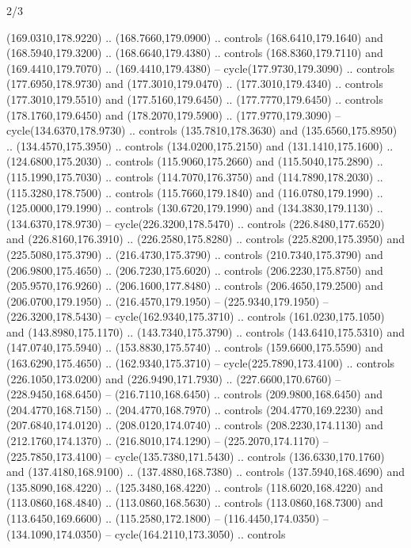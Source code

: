 \begin{flagdescription}{2/3}
\begin{scope}[xshift=0.5\flaglength,yshift=0.5\flagwidth,scale=\stretchfactor]
\begin{scope}[scale=0.001645\flagwidth,yshift=65mm,xshift=-63mm]
\begin{scope}[y=0.80pt, x=0.80pt, yscale=-1,]
\begin{scope}[cm={{1.33333,0.0,0.0,1.33333,(0.0,1e-05)}}]
  (169.0310,178.9220) .. (168.7660,179.0900) .. controls (168.6410,179.1640) and
  (168.5940,179.3200) .. (168.6640,179.4380) .. controls (168.8360,179.7110) and
  (169.4410,179.7070) .. (169.4410,179.4380) -- cycle(177.9730,179.3090) ..
  controls (177.6950,178.9730) and (177.3010,179.0470) .. (177.3010,179.4340) ..
  controls (177.3010,179.5510) and (177.5160,179.6450) .. (177.7770,179.6450) ..
  controls (178.1760,179.6450) and (178.2070,179.5900) .. (177.9770,179.3090) --
  cycle(134.6370,178.9730) .. controls (135.7810,178.3630) and
  (135.6560,175.8950) .. (134.4570,175.3950) .. controls (134.0200,175.2150) and
  (131.1410,175.1600) .. (124.6800,175.2030) .. controls (115.9060,175.2660) and
  (115.5040,175.2890) .. (115.1990,175.7030) .. controls (114.7070,176.3750) and
  (114.7890,178.2030) .. (115.3280,178.7500) .. controls (115.7660,179.1840) and
  (116.0780,179.1990) .. (125.0000,179.1990) .. controls (130.6720,179.1990) and
  (134.3830,179.1130) .. (134.6370,178.9730) -- cycle(226.3200,178.5470) ..
  controls (226.8480,177.6520) and (226.8160,176.3910) .. (226.2580,175.8280) ..
  controls (225.8200,175.3950) and (225.5080,175.3790) .. (216.4730,175.3790) ..
  controls (210.7340,175.3790) and (206.9800,175.4650) .. (206.7230,175.6020) ..
  controls (206.2230,175.8750) and (205.9570,176.9260) .. (206.1600,177.8480) ..
  controls (206.4650,179.2500) and (206.0700,179.1950) .. (216.4570,179.1950) --
  (225.9340,179.1950) -- (226.3200,178.5430) -- cycle(162.9340,175.3710) ..
  controls (161.0230,175.1050) and (143.8980,175.1170) .. (143.7340,175.3790) ..
  controls (143.6410,175.5310) and (147.0740,175.5940) .. (153.8830,175.5740) ..
  controls (159.6600,175.5590) and (163.6290,175.4650) .. (162.9340,175.3710) --
  cycle(225.7890,173.4100) .. controls (226.1050,173.0200) and
  (226.9490,171.7930) .. (227.6600,170.6760) -- (228.9450,168.6450) --
  (216.7110,168.6450) .. controls (209.9800,168.6450) and (204.4770,168.7150) ..
  (204.4770,168.7970) .. controls (204.4770,169.2230) and (207.6840,174.0120) ..
  (208.0120,174.0740) .. controls (208.2230,174.1130) and (212.1760,174.1370) ..
  (216.8010,174.1290) -- (225.2070,174.1170) -- (225.7850,173.4100) --
  cycle(135.7380,171.5430) .. controls (136.6330,170.1760) and
  (137.4180,168.9100) .. (137.4880,168.7380) .. controls (137.5940,168.4690) and
  (135.8090,168.4220) .. (125.3480,168.4220) .. controls (118.6020,168.4220) and
  (113.0860,168.4840) .. (113.0860,168.5630) .. controls (113.0860,168.7300) and
  (113.6450,169.6600) .. (115.2580,172.1800) -- (116.4450,174.0350) --
  (134.1090,174.0350) -- cycle(164.2110,173.3050) .. controls

\end{scope}
\end{scope}
\end{scope}
\end{scope}
\end{flagdescription}
